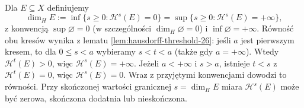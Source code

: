\begin{definicja}
\label{def:hausdorff-dimension-26}
Dla $E\subseteq X$ definiujemy
\[
 \dim_H E:=\inf\{s\ge0:\mathcal H^s(E)=0\}
 =\sup\{s\ge0:\mathcal H^s(E)=+\infty\},
\]
z konwencją $\sup\varnothing=0$ (w szczególności
$\dim_H\varnothing=0$) i $\inf\varnothing=+\infty$.
Równość obu kresów wynika z lematu
\ref{lem:hausdorff-threshold-26}: jeśli $a$ jest
pierwszym kresem, to dla $0\le s<a$ wybieramy
$s<t<a$ (także gdy $a=+\infty$). Wtedy
$\mathcal H^t(E)>0$, więc $\mathcal H^s(E)=+\infty$.
Jeżeli $a<+\infty$ i $s>a$, istnieje $t<s$
z $\mathcal H^t(E)=0$, więc $\mathcal H^s(E)=0$.
Wraz z przyjętymi konwencjami dowodzi to równości.
Przy skończonej wartości granicznej $s=\dim_H E$ miara
$\mathcal H^s(E)$ może być zerowa, skończona dodatnia
lub nieskończona.
\end{definicja}

